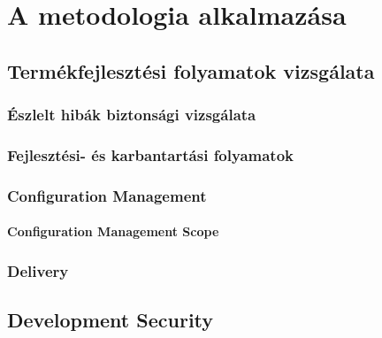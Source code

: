 \chapter{A metodologia alkalmazása}

\section{Termékfejlesztési folyamatok vizsgálata}
\subsection{Észlelt hibák biztonsági vizsgálata}

\subsection{Fejlesztési- és karbantartási folyamatok}

\subsection{Configuration Management}
\subsubsection{Configuration Management Scope}

\subsection{Delivery}

\section{Development Security}
